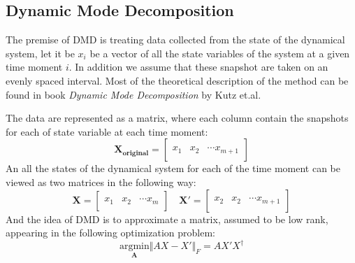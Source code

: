 \documentclass{article}
\begin{document}
    \subsection*{Dynamic Mode Decomposition}
        \hspace{1.1em}
        The premise of DMD is treating data collected from the state of the dynamical system, let it be $x_i$ be a vector of all the state variables of the system at a given time moment $i$. In addition we assume that these snapshot are taken on an evenly spaced interval. Most of the theoretical description of the method can be found in book \textit{Dynamic Mode Decomposition} by Kutz et.al\cite{dmd_book}.
        \par
        The data are represented as a matrix, where each column contain the snapshots for each of state variable at each time moment: 
        \begin{equation*}\tag{1}\label{eqn:1}
            \mathbf{X_{\text{original}}} =
            \begin{bmatrix}
                \\[1em]
                x_1 & x_2 & \cdots x_{m + 1}
                \\[2em]
            \end{bmatrix}
        \end{equation*}
        An all the states of the dynamical system for each of the time moment can be viewed as two matrices in the following way: 
        \begin{equation*}\tag{2}\label{eqn:2}
            \mathbf{X} = \begin{bmatrix}
                \\[1em]
                x_1 & x_2 & \cdots x_{m}
                \\[2em]
            \end{bmatrix} 
            \quad 
            \mathbf{X'} = \begin{bmatrix}
                \\[1em]
                x_2 & x_2 & \cdots x_{m + 1}
                \\[2em]
            \end{bmatrix}
        \end{equation*}
        And the idea of DMD is to approximate a matrix, assumed to be low rank, appearing in the following optimization problem: 
        \begin{equation*}\tag{3}\label{eqn:3}
            \underset{\mathbf{A}}{\text{argmin}}
                \Vert AX - X'\Vert_F
            = AX'X^\dagger
        \end{equation*}
\end{document}

